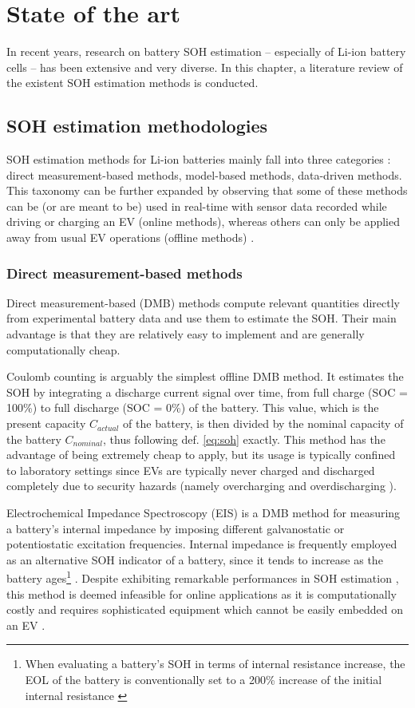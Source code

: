 \chapter{State of the art}
\label{sec:state_of_the_art}
In recent years, research on battery SOH estimation -- especially of Li-ion battery cells \cite{survey1} -- has been extensive and very diverse. In this chapter, a literature review of the existent SOH estimation methods is conducted.

\section{SOH estimation methodologies}
\label{soh_est_methods}
SOH estimation methods for Li-ion batteries mainly fall into three categories \cite{survey1}: direct measurement-based methods, model-based methods, data-driven methods. This taxonomy can be further expanded by observing that some of these methods can be (or are meant to be) used in real-time with sensor data recorded while driving or charging an EV (online methods), whereas others can only be applied away from usual EV operations (offline methods) \cite{survey2}.

\subsection{Direct measurement-based methods}
\label{sec:dmb_methods}
Direct measurement-based (DMB) methods compute relevant quantities directly from experimental battery data and use them to estimate the SOH. Their main advantage is that they are relatively easy to implement and are generally computationally cheap.

Coulomb counting \cite{coulomb_counting} is arguably the simplest offline DMB method. It estimates the SOH by integrating a discharge current signal over time, from full charge (SOC = 100\%) to full discharge (SOC = 0\%) of the battery. This value, which is the present capacity $C_{actual}$ of the battery, is then divided by the nominal capacity of the battery $C_{nominal}$, thus following def. \ref{eq:soh} exactly. This method has the advantage of being extremely cheap to apply, but its usage is typically confined to laboratory settings since EVs are typically never charged and discharged completely due to security hazards (namely overcharging and overdischarging \cite{overcharging}).

Electrochemical Impedance Spectroscopy (EIS) \cite{eis2} is a DMB method for measuring a battery's internal impedance by imposing different galvanostatic or potentiostatic excitation frequencies. Internal impedance is frequently employed as an alternative SOH indicator of a battery, since it tends to increase as the battery ages\footnote{When evaluating a battery's SOH in terms of internal resistance increase, the EOL of the battery is conventionally set to a 200\% increase of the initial internal resistance \cite{r_eol_convention}} \cite{eis3, survey3}. Despite exhibiting remarkable performances in SOH estimation \cite{eis2}, this method is deemed infeasible for online applications as it is computationally costly and requires sophisticated equipment which cannot be easily embedded on an EV \cite{survey1, survey3}.

